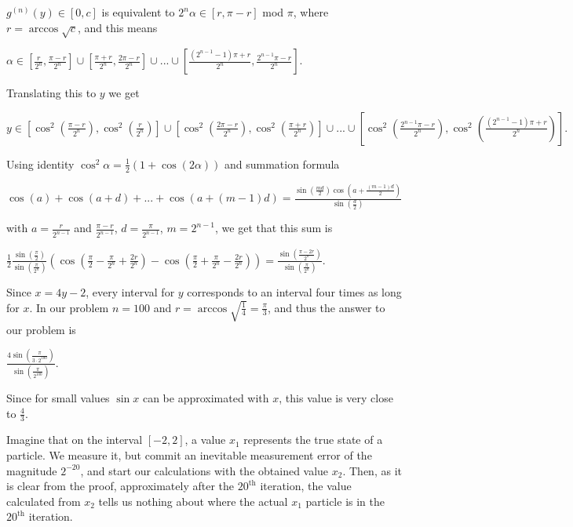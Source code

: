 \documentclass{article}
\begin{document}
\(\displaystyle g^{(n)}(y)\in [0,c]\) is equivalent to \(\displaystyle 2^n\alpha\in [r,\pi-r]\) mod \(\displaystyle \pi\), where \(\displaystyle r=\arccos{\sqrt{c}}\), and this means

\(\displaystyle \alpha\in \left[\frac{r}{2^n}, \frac{\pi-r}{2^n}\right]\cup \left[\frac{\pi+r}{2^n}, \frac{2\pi-r}{2^n}\right]\cup ... \cup \left[\frac{(2^{n-1}-1)\pi+r}{2^n}, \frac{2^{n-1}\pi-r}{2^n}\right].\)

Translating this to \(\displaystyle y\) we get

\(\displaystyle y\in \left[\cos^2(\frac{\pi-r}{2^n}), \cos^2(\frac{r}{2^n})\right]\cup \left[\cos^2(\frac{2\pi-r}{2^n}), \cos^2(\frac{\pi+r}{2^n})\right]\cup ... \cup \left[\cos^2(\frac{2^{n-1}\pi-r}{2^n}), \cos^2(\frac{(2^{n-1}-1)\pi+r}{2^n})\right].\)

Using identity \(\displaystyle \cos^2\alpha=\frac{1}{2}(1+\cos(2\alpha))\) and summation formula

\(\displaystyle \cos(a)+\cos(a+d)+...+\cos(a+(m-1)d)=\frac{\sin\left(\frac{md}{2}\right)\cos\left(a+\frac{(m-1)d}{2}\right)}{\sin\left(\frac{d}{2}\right)}\)

with \(\displaystyle a=\frac{r}{2^{n-1}}\) and \(\displaystyle \frac{\pi-r}{2^{n-1}}\), \(\displaystyle d=\frac{\pi}{2^{n-1}}\), \(\displaystyle m=2^{n-1}\), we get that this sum is

\(\displaystyle \frac{1}{2}\frac{\sin(\frac{\pi}{2})}{\sin(\frac{\pi}{2^n})}\left(\cos(\frac{\pi}{2}-\frac{\pi}{2^n}+\frac{2r}{2^n})-\cos(\frac{\pi}{2}+\frac{\pi}{2^n}-\frac{2r}{2^n})\right)=\frac{\sin\left(\frac{\pi-2r}{2^n}\right)}{\sin\left(\frac{\pi}{2^n}\right)}.\)

Since \(\displaystyle x=4y-2\), every interval for \(\displaystyle y\) corresponds to an interval four times as long for \(\displaystyle x\). In our problem \(\displaystyle n=100\) and \(\displaystyle r=\arccos{\sqrt{\frac{1}{4}}}=\frac{\pi}{3}\), and thus the answer to our problem is

\(\displaystyle \frac{4\sin\left(\frac{\pi}{3\cdot 2^{100}}\right)}{\sin\left(\frac{\pi}{2^{100}}\right)}.\)

Since for small values \(\displaystyle \sin x\) can be approximated with \(\displaystyle x\), this value is very close to \(\displaystyle \frac{4}{3}\).

Imagine that on the interval \(\displaystyle [-2,2]\), a value \(\displaystyle x_1\) represents the true state of a particle. We measure it, but commit an inevitable measurement error of the magnitude \(\displaystyle 2^{-20}\), and start our calculations with the obtained value \(\displaystyle x_2\). Then, as it is clear from the proof, approximately after the \(\displaystyle 20^{\text{th}}\) iteration, the value calculated from \(\displaystyle x_2\) tells us nothing about where the actual \(\displaystyle x_1\) particle is in the \(\displaystyle 20^{\text{th}}\) iteration.
\end{document}
